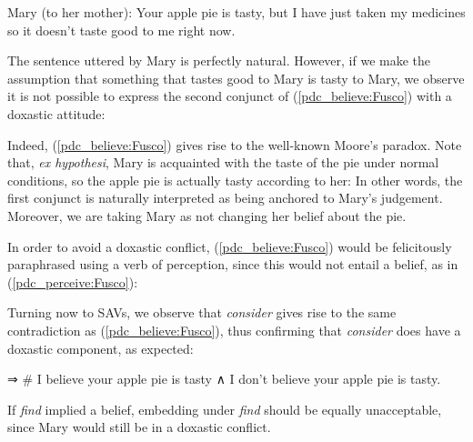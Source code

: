 \documentclass[output=paper,colorlinks,citecolor=brown]{langscibook}
\begin{document}
Mary (to her mother): Your apple pie is tasty, but I have just taken my medicines so it doesn’t taste good to me right now.
\z

The sentence uttered by Mary is perfectly natural. However, if we make the assumption that something that tastes good to Mary is tasty to Mary, we observe it is not possible to express the second conjunct of (\ref{pdc_believe:Fusco}) with a doxastic attitude:

\z

Indeed, (\ref{pdc_believe:Fusco}) gives rise to the well-known Moore's paradox. Note that, \textit{ex hypothesi}, Mary is acquainted with the taste of the pie under normal conditions, so the apple pie is actually tasty according to her: In other words, the first conjunct is naturally interpreted as being anchored to Mary's judgement. Moreover, we are taking Mary as not changing her belief about the pie.

In order to avoid a doxastic conflict, (\ref{pdc_believe:Fusco}) would be felicitously paraphrased using a verb of perception, since this would not entail a belief, as in (\ref{pdc_perceive:Fusco}):

 \label{pdc_perceive:Fusco}
\z

Turning now to SAVs, we observe that \textit{consider} gives rise to the same contradiction as (\ref{pdc_believe:Fusco}), thus confirming that \textit{consider} does have a doxastic component, as expected:
\label{pdc_consider:Fusco}

\sn ⇒ \# I believe your apple pie is tasty ∧ I don’t believe your apple pie is tasty.
\z

If \textit{find} implied a belief,  embedding under \textit{find} should be equally unacceptable, since Mary would still be in a doxastic conflict. 
\end{document}
